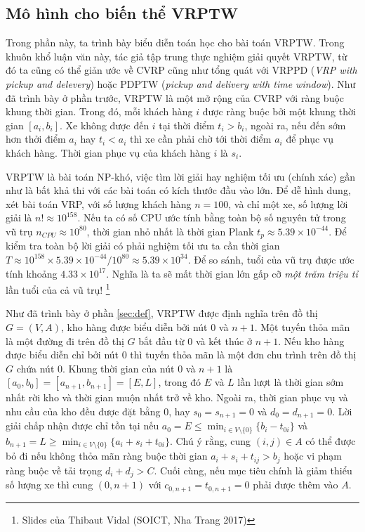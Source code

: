 \subsection{Mô hình cho biến thể VRPTW}
\label{sec:math_vrptw}

Trong phần này, ta trình bày biểu diễn toán học cho bài toán VRPTW. Trong khuôn khổ luận văn này, tác giả tập trung thực nghiệm giải quyết VRPTW, từ đó ta cũng có thể giản ước về CVRP cũng như tổng quát với VRPPD (\textit{VRP with pickup and delevery}) hoặc PDPTW (\textit{pickup and delivery with time window}). Như đã trình bày ở phần trước, VRPTW là một mở rộng của CVRP với ràng buộc khung thời gian. Trong đó, mỗi khách hàng $i$ được ràng buộc bởi một khung thời gian $[a_i,b_i]$. Xe không được đến $i$ tại thời điểm $t_i > b_i$, ngoài ra, nếu đến sớm hơn thởi điểm $a_i$ hay $t_i < a_i$ thì xe cần phải chờ tới thời điểm $a_i$ để phục vụ khách hàng. Thời gian phục vụ của khách hàng $i$ là $s_i$.

VRPTW là bài toán NP-khó, việc tìm lời giải hay nghiệm tối ưu (chính xác) gần như là bất khả thi với các bài toán có kích thước đầu vào lớn. Để dễ hình dung, xét bài toán VRP, với số lượng khách hàng $n=100$, và chỉ một xe, số lượng lời giải là $n! \approx 10^{158}$. Nếu ta có số CPU ước tính bằng toàn bộ số nguyên tử trong vũ trụ $n_{CPU} \approx 10^{80}$, thời gian nhỏ nhất là thời gian Plank $t_p \approx 5.39 \times 10^{-44}$. Để kiểm tra toàn bộ lời giải có phải nghiệm tối ưu ta cần thời gian $T \approx 10^{158} \times 5.39 \times 10^{-44} / 10^{80} \approx 5.39 \times 10^{34}$. Để so sánh, tuổi của vũ trụ được ước tính khoảng $4.33 \times 10^{17}$. Nghĩa là ta sẽ mất thời gian lớn gấp cỡ \textit{một trăm triệu tỉ} lần tuổi của cả vũ trụ! \footnote[1]{Slides của Thibaut Vidal (SOICT, Nha Trang 2017)}

Như đã trình bày ở phần \ref{sec:def}, VRPTW được định nghĩa trên đồ thị $G = (V, A)$, kho hàng được biểu diễn bởi nút $0$ và $n+1$. Một tuyến thỏa mãn là một đường đi trên đồ thị $G$ bắt đầu từ $0$ và kết thúc ở $n+1$. Nếu kho hàng được biểu diễn chỉ bởi nút $0$ thì tuyến thỏa mãn là một đơn chu trình trên đồ thị $G$ chứa nút $0$. Khung thời gian của nút $0$ và $n+1$ là $[a_0, b_0] = [a_{n+1}, b_{n+1}] = [E, L]$, trong đó $E$ và $L$ lần lượt là thời gian sớm nhất rời kho và thời gian muộn nhất trở về kho. Ngoài ra, thời gian phục vụ và nhu cầu của kho đều được đặt bằng 0, hay $s_0 = s_{n+1} = 0$ và $d_0 = d_{n+1} = 0$. Lời giải chấp nhận được chỉ tồn tại nếu $a_0 = E \leq \min_{i \in V \setminus \{0\}} \{b_i - t_{0i}\}$ và $b_{n+1} = L \geq \min_{i \in V \setminus \{0\}} \{ a_i + s_i + t_{0i} \}$. Chú ý rằng, cung $(i,j) \in A$ có thể được bỏ đi nếu không thỏa mãn ràng buộc thời gian $a_i + s_i + t_{ij} > b_j$ hoặc vi phạm ràng buộc về tải trọng $d_i + d_j > C$. Cuối cùng, nếu mục tiêu chính là giảm thiểu số lượng xe thì cung $(0,n+1)$ với $c_{0,n+1} = t_{0,n+1} = 0$ phải được thêm vào $A$.

